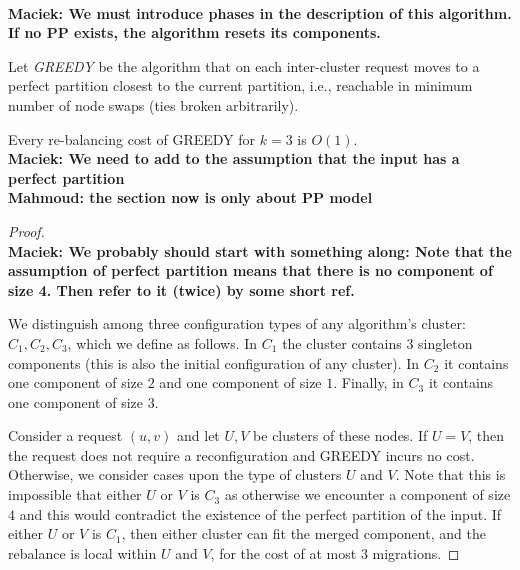 \documentclass[manuscript,screen=true]{acmart}
\newcommand\mahmoud[1]{\color{green}\textbf{\\ Mahmoud: #1}\\\color{black}}
\newcommand\maciek[1]{\color{brown}\textbf{\\ Maciek: #1}\color{black}}
\begin{document}
\begin{appendix}
  \maciek{We must introduce phases in the description of this algorithm. If no PP exists, the algorithm resets its components.}
  
  Let \emph{GREEDY} be the algorithm that on each inter-cluster request
   moves to a perfect partition
  closest to the current partition,
  i.e.,
  reachable in minimum number of node swaps (ties broken arbitrarily).
  
  \begin{lemma} \label{lemma:k=3}
    Every re-balancing cost of GREEDY for $k=3$ is $O(1)$.
    \maciek{We need to add to the assumption that the input has a perfect partition
    \mahmoud{the section now is only about PP model}}
    \label{rebalancing-cost}
  \end{lemma}
  
  \begin{proof} 
  
    \maciek{We probably should start with something along: Note that the assumption of perfect partition means that there is no component of size 4. Then refer to it (twice) by some short ref.}
    
    We distinguish among three configuration types of any algorithm's cluster: $C_1, C_2, C_3$, which we define as follows. In $C_1$ the cluster contains $3$ singleton components (this is also the initial configuration of any cluster). In $C_2$ it contains one component of size $2$ and one component of size $1$. Finally, in $C_3$ it contains one component of size $3$.
  
    Consider a request $(u, v)$ and let $U, V$ be clusters of these nodes.
    If $U=V$, then the request does not require a reconfiguration and GREEDY incurs no cost.
    Otherwise, we consider cases upon the type of clusters $U$ and $V$.
    Note that this is impossible that either $U$ or $V$ is $C_3$ as otherwise we encounter a component of size $4$ and this would contradict the existence of the perfect partition of the input.
    If either $U$ or $V$ is $C_1$, then either cluster can fit the merged component, and the rebalance is local within $U$ and $V$, for the cost of at most $3$ migrations.
  

\end{proof}
\end{appendix}
\end{document}
